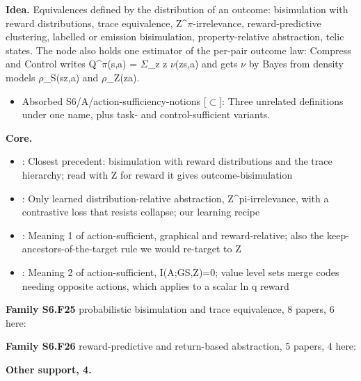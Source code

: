 \documentclass[10pt]{article}
\newcommand{\memb}[1]{\par\smallskip\textbf{#1}\quad}
\begin{document}
\textbf{Idea.} Equivalences defined by the distribution of an outcome: bisimulation with reward distributions, trace equivalence, Z\^{}\ensuremath{\pi}-irrelevance, reward-predictive clustering, labelled or emission bisimulation, property-relative abstraction, telic states. The node also holds one estimator of the per-pair outcome law: Compress and Control writes Q\^{}\ensuremath{\pi}(s,a) = \ensuremath{\Sigma}\_z z \ensuremath{\nu}(z\textbar{}s,a) and gets \ensuremath{\nu} by Bayes from density models \ensuremath{\rho}\_S(s\textbar{}z,a) and \ensuremath{\rho}\_Z(z\textbar{}a).
\begin{itemize}[nosep,leftmargin=1.2em]
\item Absorbed S6/A/action-sufficiency-notions [\ensuremath{\subset}]: Three unrelated definitions under one name, plus task- and control-sufficient variants.
\end{itemize}


\memb{Core.}
\begin{itemize}[nosep,leftmargin=1.2em]
\item \citet{Castro-equivalence09}: Closest precedent: bisimulation with reward distributions and the trace hierarchy; read with Z for reward it gives outcome-bisimulation
\item \citet{Liu-returnbased21}: Only learned distribution-relative abstraction, Z\^{}pi-irrelevance, with a contrastive loss that resists collapse; our learning recipe
\item \citet{Huang-action22}: Meaning 1 of action-sufficient, graphical and reward-relative; also the keep-ancestors-of-the-target rule we would re-target to Z
\item \citet{Hyeon-actionsufficient26}: Meaning 2 of action-sufficient, I(A;G\textbar{}S,Z)=0; value level sets merge codes needing opposite actions, which applies to a scalar ln q reward
\end{itemize}
\memb{Family S6.F25} probabilistic bisimulation and trace equivalence, 8 papers, 6 here: {\footnotesize \citetext{\citealp{Castro-equivalence09}; \citealp{Desharnais-bisimulation02}; \citealp{Hermanns-probabilistic14}; \citealp{Bicego-designing01}; \citealp{Fijalkow-trace15}; \citealp{Kiefer-comparing20}}}

\memb{Family S6.F26} reward-predictive and return-based abstraction, 5 papers, 4 here: {\footnotesize \citetext{\citealp{Liu-returnbased21}; \citealp{Lehnert-rewardpredictive20}; \citealp{Lehnert-rewardpredictive22}; \citealp{Yang-learning22}}}

\memb{Other support, 4.} \citetext{\citealp{Veness-compress14}; \citealp{Amir-states23}; \citealp{Schmidt-propertydriven26}; \citealp{Gu-observations25}}
\end{document}
